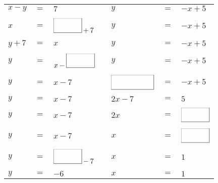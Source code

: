 \documentclass[12pt,letterpaper]{article}
\begin{document}
\begin{exercise}
\centering
\begin{tabular}{lllllll}
$x-y$ & $=$ & $7$                    &  & $y$                  & $=$ & $-x+5$                \\
      &     &                        &  &                      &     &                       \\
$x$   & $=$ & $\framebox(40,20){}+7$ &  & $y$                  & $=$ & $-x+5$                \\
      &     &                        &  &                      &     &                       \\
$y+7$ & $=$ & $x$                    &  & $y$                  & $=$ & $-x+5$                \\
      &     &                        &  &                      &     &                       \\
$y$   & $=$ & $x-\framebox(40,20){}$ &  & $y$                  & $=$ & $-x+5$                \\
      &     &   &  &                      &     &                       \\
$y$   & $=$ & $x-7$                  &  & $\framebox(60,20){}$ & $=$ & $-x+5$                \\
      &     &                        &  &                      &     &                       \\
$y$   & $=$ & $x-7$                  &  & $2x-7$               & $=$ & $5$                   \\
      &     &                        &  &                      &     &                       \\
$y$   & $=$ & $x-7$                  &  & $2x$                 & $=$ & $\framebox(40,20){}$  \\
      &     &                        &  &                      &     &                       \\
$y$   & $=$ & $x-7$                  &  & $x$                  & $=$ & $\framebox(40,20){}$  \\
      &     &                        &  &                      &     &                       \\
$y$   & $=$ & $\framebox(40,20){}-7$ &  & $x$                  & $=$ & $1$                   \\
      &     &                        &  &                      &     &                       \\
$y$   & $=$ & $-6$                   &  & $x$                  & $=$ & $1$                  
\end{tabular}
\end{exercise}
\end{document}
